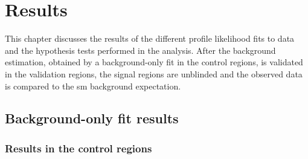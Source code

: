 

\chapter{Results}\label{ch:results}

\graphicspath{{chapter-results/Figs/Vector/}{chapter-results/Figs/}}

This chapter discusses the results of the different profile likelihood fits to data and the hypothesis tests performed in the \onelepton analysis.
After the background estimation, obtained by a background-only fit in the control regions, is validated in the validation regions, the signal regions are unblinded and the observed data is compared to the \gls{sm} background expectation.

\section{Background-only fit results}\label{sec:results_background_only}

\subsection{Results in the control regions}

